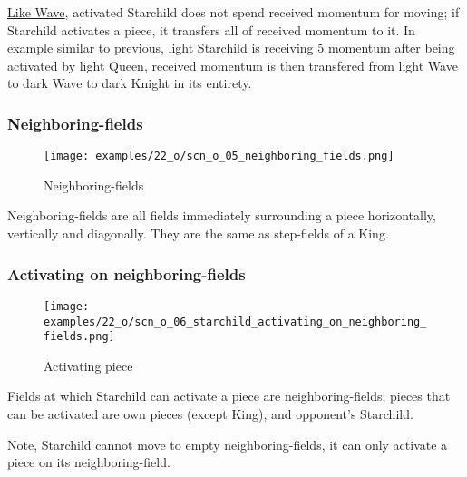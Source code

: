 \hyperref[fig:10_wave]{Like Wave}, activated Starchild does not spend received momentum for moving;
if Starchild activates a piece, it transfers all of received momentum to it. In example similar to
previous, light Starchild is receiving 5 momentum after being activated by light Queen, received
momentum is then transfered from light Wave to dark Wave to dark Knight in its entirety.

\clearpage %

\subsubsection*{Neighboring-fields}

\noindent
\begin{wrapfigure}[5]{l}{0.4\textwidth}
\centering
\texttt{[image: examples/22\_o/scn\_o\_05\_neighboring\_fields.png]}
\caption{Neighboring-fields}
\label{fig:scn_o_05_neighboring_fields}
\end{wrapfigure}
Neighboring-fields are all fields immediately surrounding a piece horizontally, vertically
and diagonally. They are the same as step-fields of a King.

\clearpage %

\subsubsection*{Activating on neighboring-fields}

\noindent
\begin{wrapfigure}[7]{l}{0.4\textwidth}
\centering
\texttt{[image: examples/22\_o/scn\_o\_06\_starchild\_activating\_on\_neighboring\_fields.png]}
\caption{Activating piece}
\label{fig:scn_o_06_starchild_activating_on_neighboring_fields}
\end{wrapfigure}
Fields at which Starchild can activate a piece are neighboring-fields; pieces that can be
activated are own pieces (except King), and opponent's Starchild.

Note, Starchild cannot move to empty neighboring-fields, it can only activate a piece on its
neighboring-field.

